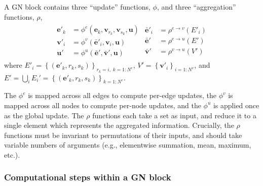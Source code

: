 \documentclass[10pt]{book}
\newcommand{\uv}{\mathbf{u}}    %
\newcommand{\ev}{\mathbf{e}}    %
\newcommand{\vv}{\mathbf{v}}    %
\begin{document}
A GN block contains three ``update'' functions, $\phi$, and three ``aggregation'' functions, $\rho$,
\begin{align}
  \begin{split}
    \ev'_k &= \phi^e\left(\ev_k, \vv_{r_k}, \vv_{s_k}, \uv \right) \\
    \vv'_i &= \phi^v\left(\mathbf{\bar{e}}'_i, \vv_i, \uv \right) \\
    \uv' &= \phi^u\left(\mathbf{\bar{e}}', \mathbf{\bar{v}}', \uv \right)
  \end{split}
  \begin{split}
    \mathbf{\bar{e}}'_i &= \rho^{e \rightarrow v}\left(E'_i\right) \\
    \mathbf{\bar{e}}' &= \rho^{e \rightarrow u}\left(E'\right) \\
    \mathbf{\bar{v}}' &= \rho^{v \rightarrow u}\left(V'\right)   
  \end{split}
  \label{eq:gn-functions}
\end{align}
where $E'_i = \left\{\left(\ev'_k, r_k, s_k \right)\right\}_{r_k=i,\; k=1:N^e}$, $V'=\left\{\vv'_i\right\}_{i=1:N^v}$, and $E' = \bigcup_i E_i' = \left\{\left(\ev'_k, r_k, s_k \right)\right\}_{k=1:N^e}$.

The $\phi^e$ is mapped across all edges to compute per-edge updates, the $\phi^v$ is mapped across all nodes to compute per-node updates, and the $\phi^u$ is applied once as the global update.
%
The $\rho$ functions each take a set as input, and reduce it to a single element which represents the aggregated information. Crucially, the $\rho$ functions must be invariant to permutations of their inputs, and should take variable numbers of arguments (e.g., elementwise summation, mean, maximum, etc.).

\subsubsection{Computational steps within a GN block}
\end{document}
